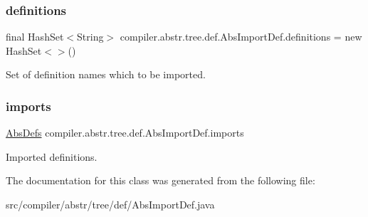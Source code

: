 \subsubsection{\texorpdfstring{definitions}{definitions}}
{\footnotesize\ttfamily final Hash\+Set$<$String$>$ compiler.\+abstr.\+tree.\+def.\+Abs\+Import\+Def.\+definitions = new Hash\+Set$<$$>$()}

Set of definition names which to be imported. \mbox{\label{classcompiler_1_1abstr_1_1tree_1_1def_1_1_abs_import_def_af96bd2823562fa654426c02d7e704c02}} 
\subsubsection{\texorpdfstring{imports}{imports}}
{\footnotesize\ttfamily \hyperlink{classcompiler_1_1abstr_1_1tree_1_1_abs_defs}{Abs\+Defs} compiler.\+abstr.\+tree.\+def.\+Abs\+Import\+Def.\+imports}

Imported definitions. 

The documentation for this class was generated from the following file\+:\begin{DoxyCompactItemize}
\item 
src/compiler/abstr/tree/def/Abs\+Import\+Def.\+java\end{DoxyCompactItemize}
